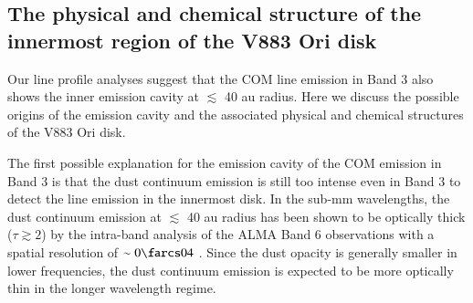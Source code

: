 \documentclass[linenumbers, twocolumn, twocolappendix, astrosymb, times]{aastex631}
\begin{document}



\subsection{The physical and chemical structure of the innermost region of the V883 Ori disk}\label{subsec:physicochemical_structure}
Our line profile analyses suggest that the COM line emission in Band 3 also shows the inner emission cavity at $\lesssim$ 40 au radius. Here we discuss the possible origins of the emission cavity and the associated physical and chemical structures of the V883 Ori disk. 


The first possible explanation for the emission cavity of the COM emission in Band 3 is that the dust continuum emission is still too intense even in Band 3 to detect the line emission in the innermost disk. In the sub-mm wavelengths, the dust continuum emission at $\lesssim$ 40 au radius has been shown to be optically thick ($\tau \gtrsim 2$) by the intra-band analysis of the ALMA Band 6 observations with a spatial resolution of $\sim0\farcs04$ \citep{Cieza2016}. Since the dust opacity is generally smaller in lower frequencies, the dust continuum emission is expected to be more optically thin in the longer wavelength regime. 
\end{document}
